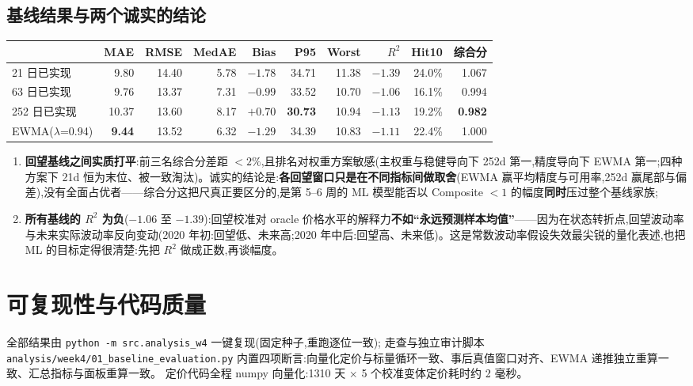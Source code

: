 \documentclass[11pt]{ctexart}
\begin{document}
\subsection{基线结果与两个诚实的结论}
\begin{center}
\small
\begin{tabular}{lrrrrrrrrr}
\toprule
& \textbf{MAE} & \textbf{RMSE} & \textbf{MedAE} & \textbf{Bias} & \textbf{P95} & \textbf{Worst} & \textbf{$R^2$} & \textbf{Hit10} & \textbf{综合分} \\
\midrule
21 日已实现 & 9.80 & 14.40 & 5.78 & $-1.78$ & 34.71 & 11.38 & $-1.39$ & 24.0\% & 1.067 \\
63 日已实现 & 9.76 & 13.37 & 7.31 & $-0.99$ & 33.52 & 10.70 & $-1.06$ & 16.1\% & 0.994 \\
252 日已实现 & 10.37 & 13.60 & 8.17 & $+0.70$ & \textbf{30.73} & 10.94 & $-1.13$ & 19.2\% & \textbf{0.982} \\
EWMA($\lambda$=0.94) & \textbf{9.44} & 13.52 & 6.32 & $-1.29$ & 34.39 & 10.83 & $-1.11$ & 22.4\% & 1.000 \\
\bottomrule
\end{tabular}
\end{center}

\begin{enumerate}
  \item \textbf{回望基线之间实质打平}:前三名综合分差距 $<2\%$,且排名对权重方案敏感(主权重与稳健导向下 252d 第一,精度导向下 EWMA 第一;四种方案下 21d 恒为末位、被一致淘汰)。诚实的结论是:\textbf{各回望窗口只是在不同指标间做取舍}(EWMA 赢平均精度与可用率,252d 赢尾部与偏差),没有全面占优者——综合分这把尺真正要区分的,是第 5--6 周的 ML 模型能否以 Composite $<1$ 的幅度\textbf{同时}压过整个基线家族;
  \item \textbf{所有基线的 $R^2$ 为负}($-1.06$ 至 $-1.39$):回望校准对 oracle 价格水平的解释力\textbf{不如``永远预测样本均值''}——因为在状态转折点,回望波动率与未来实际波动率反向变动(2020 年初:回望低、未来高;2020 年中后:回望高、未来低)。这是常数波动率假设失效最尖锐的量化表述,也把 ML 的目标定得很清楚:先把 $R^2$ 做成正数,再谈幅度。
\end{enumerate}

\section{可复现性与代码质量}
全部结果由 \texttt{python -m src.analysis\_w4} 一键复现(固定种子,重跑逐位一致);
走查与独立审计脚本 \texttt{analysis/week4/01\_baseline\_evaluation.py} 内置四项断言:向量化定价与标量循环一致、事后真值窗口对齐、EWMA 递推独立重算一致、汇总指标与面板重算一致。
定价代码全程 numpy 向量化:1310 天 $\times$ 5 个校准变体定价耗时约 2 毫秒。
\end{document}
